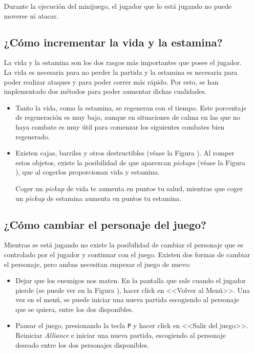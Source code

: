 Durante la ejecución del minijuego, el jugador que lo está jugando no puede moverse ni atacar.


\subsection{¿Cómo incrementar la vida y la estamina?}

La vida y la estamina son los dos rasgos más importantes que posee el jugador. La vida es necesaria para no perder la partida y la estamina es necesaria para poder realizar ataques y para poder correr más rápido. Por esto, se han implementado dos métodos para poder aumentar dichas cualidades.

\begin{itemize}
\item Tanto la vida, como la estamina, se regeneran con el tiempo. Este porcentaje de regeneración es muy bajo, aunque en situaciones de calma en las que no haya combate es muy útil para comenzar los siguientes combates bien regenerado.

\item Existen cajas, barriles y otros destructibles (véase la Figura ). Al romper estos objetos, existe la posibilidad de que aparezcan \textit{pickups} (véase la Figura ), que al cogerlos proporcionan vida y estamina.

Coger un \textit{pickup} de vida te aumenta en  puntos tu salud, mientras que coger un \textit{pickup} de estamina aumenta en  puntos tu estamina.
\end{itemize}


\subsection{¿Cómo cambiar el personaje del juego?}

Mientras se está jugando no existe la posibilidad de cambiar el personaje que es controlado por el jugador y continuar con el juego. Existen dos formas de cambiar el personaje, pero ambas necesitan empezar el juego de nuevo:

\begin{itemize}
\item Dejar que los enemigos nos maten. En la pantalla que sale cuando el jugador pierde (se puede ver en la Figura ), hacer click en <<Volver al Menú>>. Una vez en el menú, se puede iniciar una nueva partida escogiendo al personaje que se quiera, entre los dos disponibles.
\item Pausar el juego, presionando la tecla \texttt{P} y hacer click en <<Salir del juego>>. Reiniciar \textit{Alliance} e iniciar una nueva partida, escogiendo al personaje deseado entre los dos personajes disponibles.
\end{itemize}

